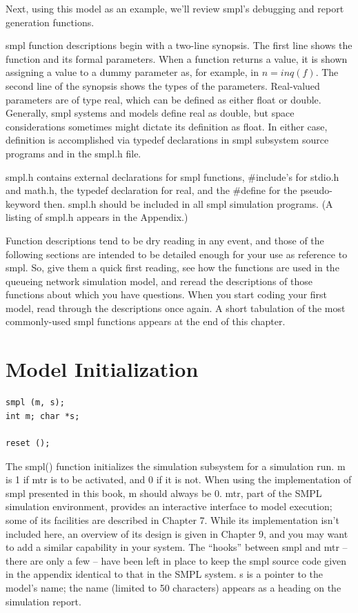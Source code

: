 \noindent Next, using this model as an example, we'll review smpl's debugging and report
generation functions.

smpl function descriptions begin with a two-line synopsis. The first line
shows the function and its formal parameters. When a function returns a value,
it is shown assigning a value to a dummy parameter as, for example, in
\ensuremath{n = inq(f)}. The second line of the synopsis shows the types of the
parameters. Real-valued parameters are of type real, which can be defined as
either float or double. Generally, smpl systems and models define real as
double, but space considerations sometimes might dictate its definition as
float. In either case, definition is accomplished via typedef declarations in
smpl subsystem source programs and in the smpl.h file.

smpl.h contains external declarations for smpl functions, \#include's for
stdio.h and math.h, the typedef declaration for real, and the \#define for the
pseudo-keyword then. smpl.h should be included in all smpl simulation
programs. (A listing of smpl.h appears in the Appendix.)

Function descriptions tend to be dry reading in any event, and those of the
following sections are intended to be detailed enough for your use as
reference to smpl. So, give them a quick first reading, see how the functions
are used in the queueing network simulation model, and reread the
descriptions of those functions about which you have questions. When you
start coding your first model, read through the descriptions once again. A
short tabulation of the most commonly-used smpl functions appears at the end
of this chapter.

\section{Model Initialization}
\label{sec:smpl-model-initialization}

\begin{verbatim}
smpl (m, s);
int m; char *s;

reset ();
\end{verbatim}

The smpl() function initializes the simulation subsystem for a simulation run.
m is 1 if mtr is to be activated, and 0 if it is not. When using the
implementation of smpl presented in this book, m should always be 0. mtr,
part of the SMPL simulation environment, provides an interactive interface to
model execution; some of its facilities are described in Chapter 7. While its
implementation isn't included here, an overview of its design is given in
Chapter 9, and you may want to add a similar capability in your system. The
``hooks'' between smpl and mtr -- there are only a few -- have been left in
place to keep the smpl source code given in the appendix identical to that
\noindent in the SMPL system. s is a pointer to the model's name; the name (limited to 50
characters) appears as a heading on the simulation report.

